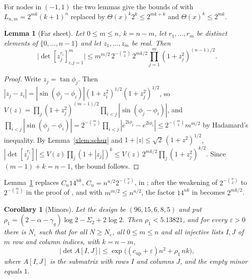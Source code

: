 \documentclass[11pt]{article}
\newtheorem{lemma}[theorem]{Lemma}
\newtheorem{corollary}[theorem]{Corollary}
\theoremstyle{definition}
\begin{document}
For nodes in $(-1,1)$ the two lemmas give the bounds of \cite[Lemma~4.1, Corollary~4.2]{Jha} with $L_{n,m}=2^{mk}(k+1)^n$ replaced by $\Theta(x)^k2^k\le2^{mk+k}$ and $\Theta(x)^k\le2^{mk}$.

\begin{lemma}[Far sheet]\label{xlem:far}
Let $0\le m\le n$, $k=n-m$, let $r_1,\dots,r_m$ be distinct elements of $\{0,\dots,n-1\}$ and let $z_1,\dots,z_m$ be real. Then
\[
\big|\det[z_j^{r_i}]_{i,j=1}^m\big|\le m^{m/2}\,2^{-\binom m2}\,2^{mk/2}\prod_{j=1}^m(1+z_j^2)^{(n-1)/2}.
\]
\end{lemma}

\begin{proof}
Write $z_j=\tan\phi_j$. Then $|z_j-z_i|=|\sin(\phi_j-\phi_i)|(1+z_i^2)^{1/2}(1+z_j^2)^{1/2}$, so $V(z)=\prod_j(1+z_j^2)^{(m-1)/2}\prod_{i<j}|\sin(\phi_j-\phi_i)|$, and $\prod_{i<j}|\sin(\phi_j-\phi_i)|=2^{-\binom m2}\prod_{i<j}|e^{2\mathrm i\phi_j}-e^{2\mathrm i\phi_i}|\le2^{-\binom m2}m^{m/2}$ by Hadamard's inequality. By Lemma~\ref{xlem:schur} and $1+|z|\le\sqrt2\,(1+z^2)^{1/2}$, $|\det[z_j^{r_i}]|\le V(z)\prod_j(1+|z_j|)^k\le V(z)\,2^{mk/2}\prod_j(1+z_j^2)^{k/2}$. Since $(m-1)+k=n-1$, the bound follows.
\end{proof}

Lemma~\ref{xlem:far} replaces $C_n14^{nk}$, $C_n=n^{n/2}2^{-\binom n2}$, in \cite[Lemma~4.5]{Jha}; after the weakening of $2^{-\binom n2}$ to $2^{-\binom m2}$ in the proof of \cite[Lemma~6.2]{Jha}, and with $m^{m/2}\le n^{n/2}$, the factor $14^{nk}$ in \cite[(6.6)]{Jha} becomes $2^{mk/2}$.

\begin{corollary}[Minors]\label{xcor:massminors}
Let the design be $(96,15,6,8,5)$ and put $\rho_1=(2-\alpha-\gamma_g)\log2-\Sigma_2+2\log2$. Then $\rho_1<5.13821$, and for every $\varepsilon>0$ there is $N_\varepsilon$ such that for all $N\ge N_\varepsilon$, all $0\le m\le n$ and all injective lists $I,J$ of $m$ row and column indices, with $k=n-m$,
\[
\big|\det A[I,J]\big|\le\exp\!\big((c_{\mathrm{up}}+\varepsilon)n^2+\rho_1\,nk\big),
\]
where $A[I,J]$ is the submatrix with rows $I$ and columns $J$, and the empty minor equals $1$.
\end{corollary}
\end{document}
